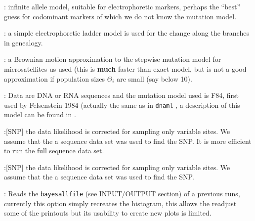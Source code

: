 \begin{description}
\item{:} infinite allele model, suitable for electrophoretic
markers, perhaps the ``best'' guess for 
codominant markers of which we do not know the mutation model.
\item{:} a simple electrophoretic ladder model is 
used for the change along the branches in genealogy.
\item{:} a Brownian motion approximation to 
the stepwise mutation
model for microsatellites us used (this is {\bf much} faster 
than exact model,
but is not a good approximation if population sizes $\Theta_i$ 
are small (say below 10).
\item{:} Data are DNA or RNA sequences and the mutation model used is F84, first used by Felsenstein 1984 (actually the same
as in {\tt dnaml} \citep[Phylip version 3.5; ][]{felsenstein:1993:ppia}, a description of this model 
can be found in \cite{swofford:1996:pi}. 
\item{:}[SNP] the data likelihood is corrected for 
sampling only variable sites. We assume that the a sequence data set
was used to find the SNP. It is more efficient to run the full sequence
data set.
\item{:}[SNP] the data likelihood is corrected for 
sampling only variable sites. We assume that the a sequence data set
was used to find the SNP. 
\item{:} Reads the {\tt bayesallfile}   (see INPUT/OUTPUT section) of a previous runs,
currently this option simply recreates the histogram, this allows the readjust some of the printouts but its usability to
create new plots is limited.
\end{description} 

